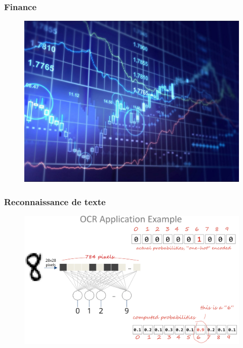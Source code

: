 \documentclass[compress]{beamer}
\begin{document}
\begin{frame}
	\frametitle{Finance}
	
	\begin{figure}
		\centering
		\includegraphics[width=0.9\linewidth]{resources/stock}
		
	\end{figure}
	
	
\end{frame}

\begin{frame}
	\frametitle{Reconnaissance de texte}
	
	\begin{figure}
		\centering
		\includegraphics[width=1\linewidth]{resources/text}
	\end{figure}
	
\end{frame}
\end{document}
